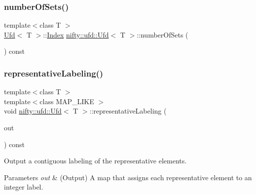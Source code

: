 \subsubsection{\texorpdfstring{number\+Of\+Sets()}{numberOfSets()}}
{\footnotesize\ttfamily template$<$class T $>$ \\
\hyperlink{classnifty_1_1ufd_1_1Ufd}{Ufd}$<$ T $>$\+::\hyperlink{classnifty_1_1ufd_1_1Ufd_a0a9a7ab02b6d77fb2035234cbda8b3a7}{Index} \hyperlink{classnifty_1_1ufd_1_1Ufd}{nifty\+::ufd\+::\+Ufd}$<$ T $>$\+::number\+Of\+Sets (\begin{DoxyParamCaption}{ }\end{DoxyParamCaption}) const\hspace{0.3cm}{\ttfamily [inline]}}

\mbox{\label{classnifty_1_1ufd_1_1Ufd_a13d68dde1039818ea71b21e72ada326a}} 
\subsubsection{\texorpdfstring{representative\+Labeling()}{representativeLabeling()}}
{\footnotesize\ttfamily template$<$class T $>$ \\
template$<$class M\+A\+P\+\_\+\+L\+I\+KE $>$ \\
void \hyperlink{classnifty_1_1ufd_1_1Ufd}{nifty\+::ufd\+::\+Ufd}$<$ T $>$\+::representative\+Labeling (\begin{DoxyParamCaption}\item[{M\+A\+P\+\_\+\+L\+I\+KE \&}]{out }\end{DoxyParamCaption}) const\hspace{0.3cm}{\ttfamily [inline]}}

Output a contiguous labeling of the representative elements.


\begin{DoxyParams}{Parameters}
{\em out} & (Output) A map that assigns each representative element to an integer label. \\
\hline
\end{DoxyParams}
\mbox{\label{classnifty_1_1ufd_1_1Ufd_a026466a86a5c41b1c0366ea82c769d5a}} 
